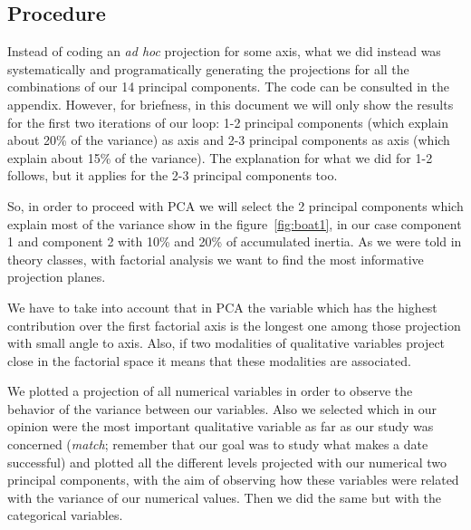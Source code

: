 \subsection{Procedure}

Instead of coding an \textit{ad hoc} projection for some axis, what we did instead was systematically and programatically generating the projections for all the combinations of our 14 principal components. The code can be consulted in the appendix. However, for briefness, in this document we will only show the results for the first two iterations of our loop: 1-2 principal components (which explain about 20\% of the variance) as axis and 2-3 principal components as axis (which explain about 15\% of the variance). The explanation for what we did for 1-2 follows, but it applies for the 2-3 principal components too.

So, in order to proceed with PCA we will select the 2 principal components which explain most of the variance show in the figure~\ref{fig:boat1}, in our case component 1 and component 2 with 10\% and 20\% of accumulated inertia. As we were told in theory classes, with factorial analysis we want to find the most informative projection planes.

We have to take into account that in PCA the variable which has the highest contribution over the first factorial axis is the longest one among those projection with small angle to axis. Also, if two modalities of qualitative variables project close in the factorial space it means that these modalities are associated.

We plotted a projection of all numerical variables in order to observe the behavior of the variance between our variables. Also we selected which in our opinion were the most important qualitative variable as far as our study was concerned (\textit{match}; remember that our goal was to study what makes a date successful) and plotted all the different levels projected with our numerical two principal components, with the aim of observing how these variables were related with the variance of our numerical values. Then we did the same but with the categorical variables.

